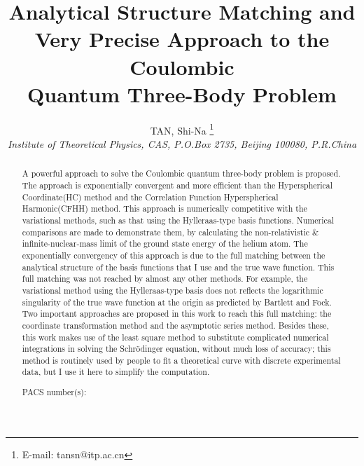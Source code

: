 \baselineskip 13pt
\textheight 25.5cm \topmargin -15.7mm
\textwidth 17.0cm \oddsidemargin -4mm \evensidemargin -4mm

\title{Analytical Structure Matching and\\
Very Precise Approach to the Coulombic\\
Quantum Three-Body Problem}

\author{TAN, Shi-Na \thanks{E-mail: tansn@itp.ac.cn}\\
{\it\small Institute of Theoretical Physics, CAS, P.O.Box 2735,
Beijing 100080, P.R.China}}

\date{}



\maketitle

\begin{abstract}
A powerful approach to solve the Coulombic quantum three-body problem
is proposed. The approach is exponentially convergent and more efficient
than the Hyperspherical Coordinate(HC) method and the Correlation Function
Hyperspherical Harmonic(CFHH) method. This approach is numerically competitive
with the variational methods, such as that using the Hylleraas-type basis
functions. Numerical comparisons are made to demonstrate them, by calculating
the non-relativistic \& infinite-nuclear-mass
limit of the ground state energy of
the helium atom. The exponentially convergency of this approach is due to the
full matching between the analytical structure of the basis functions that
I use and the true wave function. This full matching was not reached by almost
any other methods. For example, the variational method using the Hylleraas-type
basis does not reflects the logarithmic singularity of the true wave function
at the origin as predicted by Bartlett and Fock. Two important approaches
are proposed in this work to reach this full matching: the coordinate
transformation method and the asymptotic series method. Besides these, this
work makes use of the least square method to substitute complicated numerical
integrations in solving the Schr\"{o}dinger equation, without much loss of
accuracy; this method is routinely used by people to fit a theoretical curve
with discrete experimental data, but I use it here to simplify the computation.

\vspace{3mm}
{\noindent
PACS number(s):}

\end{abstract}

